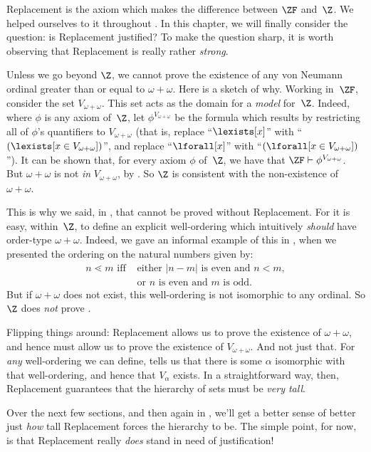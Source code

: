 \documentclass[../../../include/open-logic-section]{subfiles}
\begin{document}

Replacement is the axiom which makes the difference between $\ZF$
and~$\Z$. We helped ourselves to it throughout
. In this chapter, we
will finally consider the question: is Replacement justified? To make
the question sharp, it is worth observing that Replacement is really
rather \emph{strong}.

Unless we go beyond $\Z$, we cannot prove the existence of any von Neumann
ordinal greater than or equal to $\omega + \omega$. Here is a sketch of
why. Working in~$\ZF$, consider the set $V_{\omega+\omega}$. This set acts
as the domain for a  \emph{model} for~$\Z$. Indeed, where $\phi$ is any
axiom of~$\Z$, let $\phi^{V_{\omega+\omega}}$ be the formula which results
by restricting all of $\phi$'s quantifiers to $V_{\omega+\omega}$ (that is,
replace ``$\lexists[x]$'' with ``$(\lexists[x \in V_{\omega+\omega}])$'', and
replace ``$\lforall[x]$'' with ``$(\lforall[x \in V_{\omega+\omega}])$''). It
can be shown that, for every axiom $\phi$ of~$\Z$, we have that $\ZF \vdash
\phi^{V_{\omega+\omega}}$. But $\omega+\omega$ is not \emph{in}
$V_{\omega+\omega}$, by  . So $\Z$ is
consistent with the non-existence of $\omega+\omega$.

This is why we said, in , that
 cannot be proved
without Replacement. For it is easy, within~$\Z$, to define an
explicit well-ordering which intuitively \emph{should} have order-type
$\omega+\omega$. Indeed, we gave an informal example of this in
, when we presented the ordering on the
natural numbers given by:
\begin{align*}
	n \lessdot m \text{ iff }&\text{either $\left|n - m\right|$ is even and $n < m$},\\
	& \text{or $n$ is even and $m$ is odd.}
\end{align*}
 But if $\omega+\omega$ does not exist, this well-ordering is not
 isomorphic to any ordinal. So $\Z$ does \emph{not} prove
 . 

Flipping things around: Replacement allows us to prove the existence
of $\omega+\omega$, and hence must allow us to prove the existence of
$V_{\omega+\omega}$. And not just that. For \emph{any} well-ordering
we can define, 
tells us that there is some $\alpha$ isomorphic with that
well-ordering, and hence that $V_\alpha$ exists. In a straightforward
way, then, Replacement guarantees that the hierarchy of sets must be
\emph{very tall}. 

Over the next few sections, and then again in
, we'll get a better sense of better
just \emph{how} tall Replacement forces the hierarchy to be. The
simple point, for now, is that Replacement really \emph{does} stand in
need of justification!
\end{document}
